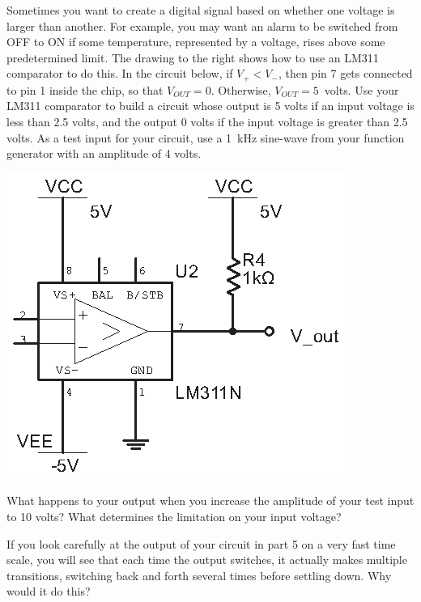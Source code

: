 \begin{enumerate}[wide]
\vspace{0.2in}
\begin{minipage}{.58\textwidth} %

\item Sometimes you want to create a digital signal based on whether one voltage is larger than another.  For example, you may want an alarm to be switched from OFF to ON if some temperature, represented by a voltage, rises above some predetermined limit. The drawing to the right shows how to use an LM311 comparator to do this.  In the circuit below, if $V_+<V_-$, then pin 7 gets connected to pin 1 inside the chip, so that $V_{OUT}=0$.  Otherwise, $V_{OUT}=5$~volts.  Use your LM311 comparator to build a circuit whose output is 5 volts if an input voltage is less than 2.5 volts, and the output 0 volts if the input voltage is greater than 2.5 volts.  As a test input for your circuit, use a 1~kHz sine-wave from your function generator with an amplitude of 4 volts.
\end{minipage}
\begin{minipage}{.39\textwidth}

\hspace{0.25in}\includegraphics{digital_electronics/basic_lm311.eps}
\end{minipage}

\pagebreak[2]

\item What happens to your output when you increase the amplitude of your test input to 10 volts?  What determines the limitation on your input voltage?

\item If you look carefully at the output of your circuit in part 5 on a very fast time scale, you will see that each time the output switches, it actually makes multiple transitions, switching back and forth several times before settling down.  Why would it do this?  


\end{enumerate}
